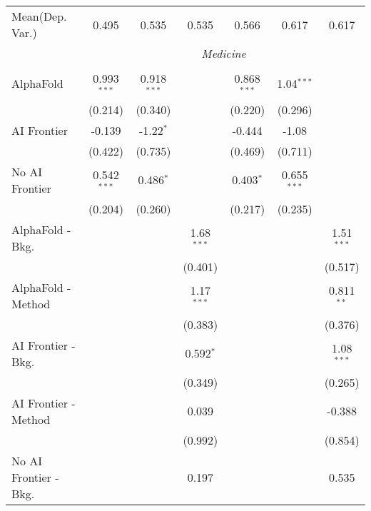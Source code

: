\begin{tabular}{lcccccc}
Mean(Dep. Var.) & 0.495 & 0.535 & 0.535 & 0.566 & 0.617 & 0.617 \\
 & \multicolumn{6}{c}{\textit{Medicine}} \\ \\
   AlphaFold               & 0.993$^{***}$ & 0.918$^{***}$ &              & 0.868$^{***}$ & 1.04$^{***}$  &   \\   
                           & (0.214)       & (0.340)       &              & (0.220)       & (0.296)       &   \\   
   AI Frontier             & -0.139        & -1.22$^{*}$   &              & -0.444        & -1.08         &   \\   
                           & (0.422)       & (0.735)       &              & (0.469)       & (0.711)       &   \\   
   No AI Frontier          & 0.542$^{***}$ & 0.486$^{*}$   &              & 0.403$^{*}$   & 0.655$^{***}$ &   \\   
                           & (0.204)       & (0.260)       &              & (0.217)       & (0.235)       &   \\   
   AlphaFold - Bkg.        &               &               & 1.68$^{***}$ &               &               & 1.51$^{***}$\\   
                           &               &               & (0.401)      &               &               & (0.517)\\   
   AlphaFold - Method      &               &               & 1.17$^{***}$ &               &               & 0.811$^{**}$\\   
                           &               &               & (0.383)      &               &               & (0.376)\\   
   AI Frontier - Bkg.      &               &               & 0.592$^{*}$  &               &               & 1.08$^{***}$\\   
                           &               &               & (0.349)      &               &               & (0.265)\\   
   AI Frontier - Method    &               &               & 0.039        &               &               & -0.388\\   
                           &               &               & (0.992)      &               &               & (0.854)\\   
   No AI Frontier - Bkg.   &               &               & 0.197        &               &               & 0.535\\   

\end{tabular}
